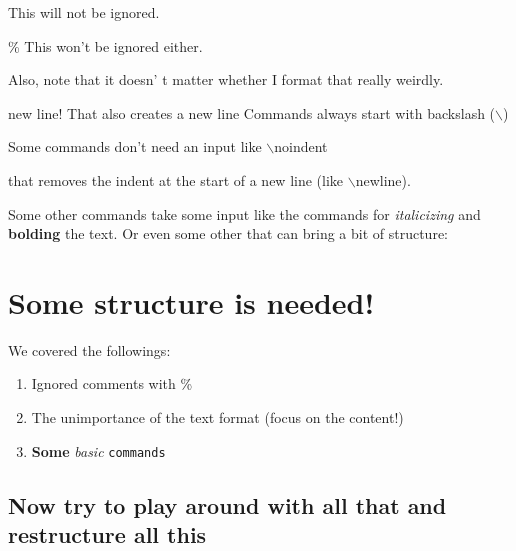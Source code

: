 \documentclass{article} %
\begin{document}


This will not be ignored.

\% This won't be ignored either. %

Also,
note
that
it doesn'
t
matter                   whether
I
    format that really weirdly.

new line!
\newline
That also creates a new line
\newline
Commands always start with backslash ($\backslash$) %

Some commands don't need an input like $\backslash$noindent %

\noindent that removes the indent at the start of a new line (like $\backslash$newline).


Some other commands take some input like the commands for \textit{italicizing} and \textbf{bolding} the text.
Or even some other that can bring a bit of structure:
\section{Some structure is needed!}
We covered the followings:

\begin{enumerate} %
\item Ignored comments with \%
\item The unimportance of the text format (focus on the content!)
\item \textbf{Some} \textit{basic} \texttt{commands} %
\end{enumerate}

\subsection*{Now try to play around with all that and restructure all this} %
\end{document}

